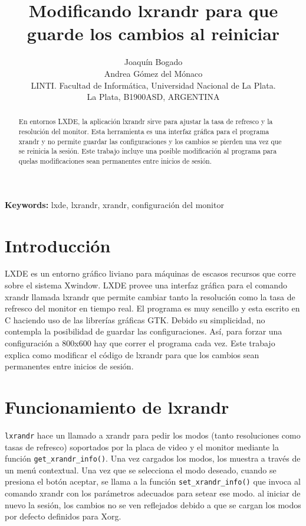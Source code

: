 \documentclass[final,narroweqnarray,inline,twoside]{ieee}
\author{Joaquín Bogado\\ Andrea Gómez del Mónaco
\\LINTI. Facultad de Informática, Universidad Nacional de La Plata.
\\La Plata, B1900ASD, ARGENTINA
}
\title{Modificando lxrandr para que guarde los cambios al reiniciar}
\begin{document}
\maketitle
\sloppy

\begin{abstract}
En entornos LXDE, la aplicación lxrandr sirve para ajustar la tasa de refresco y la resolución del monitor. Esta herramienta
es una interfaz gráfica para el programa xrandr y no permite guardar las configuraciones y los cambios se pierden una vez
que se reinicia la sesión. Este trabajo incluye una posible modificación al programa para quelas modificaciones sean
permanentes entre inicios de sesión.
\end{abstract}

\noindent \textbf{Keywords: } lxde, lxrandr, xrandr, configuración del monitor

\section{Introducción}
LXDE es un entorno gráfico liviano para máquinas de escasos recursos que corre sobre el sistema Xwindow. LXDE provee una
interfaz gráfica para el comando xrandr llamada lxrandr que permite cambiar tanto la resolución como la tasa de refresco del
monitor en tiempo real. El programa es muy sencillo y esta escrito en C haciendo uso de las librerías gráficas GTK. Debido
su simplicidad, no contempla la posibilidad de guardar las configuraciones. Así, para forzar una configuración a 800x600 hay
que correr el programa cada vez. Este trabajo explica como modificar el código de lxrandr para que los cambios sean
permanentes entre inicios de sesión. 

\section{Funcionamiento de lxrandr}
\texttt{lxrandr} hace un llamado a xrandr para pedir los modos (tanto resoluciones como tasas de refresco) soportados por la
placa de video y el monitor mediante la función \texttt{get\_xrandr\_info()}. Una vez cargados los modos, los muestra
a través de un menú contextual. Una vez que se selecciona el modo deseado, cuando se presiona el botón aceptar, se llama a
la función \texttt{set\_xrandr\_info()} que invoca al comando xrandr con los parámetros adecuados para setear ese modo.
al iniciar de nuevo la sesión, los cambios no se ven reflejados debido a que se cargan los modos por defecto definidos
para Xorg.
\end{document}
